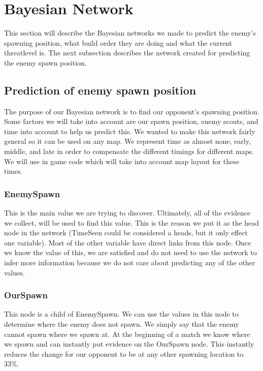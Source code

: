 \section{Bayesian Network}\label{bayesian_network}
This section will describe the Bayesian networks we made to predict the enemy's spawning position, what build order they are doing and what the current 
threatlevel is. The next subsection describes the network created for predicting the enemy spawn position.


\subsection{Prediction of enemy spawn position}			 
			
The purpose of our Bayesian network is to find our opponent's spawning position. Some factors we will take into account are our spawn position, enemy scouts, and time into account to help us predict this. We wanted to make this network fairly general so it can be used on any  map. We represent time as almost none, early, middle, and late in order to compensate the different timings for different maps. We will use in game code which will take into account map layout for these times. 

\subsubsection*{EnemySpawn}
This is the main value we are trying to discover. Ultimately, all of the evidence we collect, will be used to find this value. This is the reason we put it as the head node in the network (TimeSeen could be considered a heads, but it only effect one variable). Most of the other variable have direct links from this node. Once we know the value of this, we are satisfied and do not need to use the network to infer more information because we do not care about predicting any of the other values.

\subsubsection*{OurSpawn}
This node is a child of EnemySpawn. We can use the values in this node to determine where the enemy does not spawn. We simply say that the enemy cannot spawn where we spawn at. At the beginning of a match we know where we spawn and can instantly put evidence on the OurSpawn node. This instantly reduces the change for our opponent to be at any other spawning location to 33\%.

